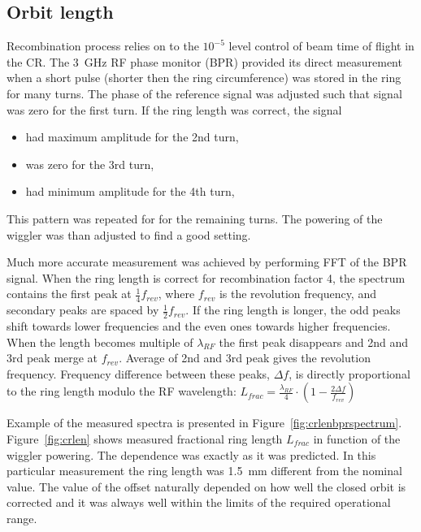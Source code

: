 \subsection{Orbit length \label{sec:ringlen}}

Recombination process relies on to the $10^{-5}$ level control of 
beam time of flight in the CR. 
The 3~GHz RF phase monitor (BPR) provided its direct measurement when a short pulse
(shorter then the ring circumference) was stored in the ring for many turns.
The phase of the reference signal was adjusted such that signal was zero for the first turn.
If the ring length was correct, the signal 
\begin{itemize}
 \item  had maximum amplitude for the 2nd turn,
 \item  was zero for the 3rd turn,
 \item  had minimum amplitude for the 4th turn,
\end{itemize}
This pattern was repeated for for the remaining turns.
The powering of the wiggler was than adjusted to find a good setting.

Much more accurate measurement was achieved by performing FFT of the BPR signal.
When the ring length is correct for recombination factor 4, 
the spectrum contains the first peak at $\frac{1}{4} f_{rev}$, 
where $f_{rev}$ is the revolution frequency, and
secondary peaks are spaced by $\frac{1}{2} f_{rev}$.
If the ring length is longer, the odd peaks shift towards 
lower frequencies and the even ones towards higher frequencies.
When the length becomes multiple of $\lambda_{RF}$ the first peak disappears
and 2nd and 3rd peak merge at $f_{rev}$.
Average of 2nd and 3rd peak gives the revolution frequency.
Frequency difference between these peaks, $\Delta f$, is directly proportional
to the ring length modulo the RF wavelength: 
$L_{frac} = \frac{\lambda_{RF}}{4} \cdot (1 - \frac{ 2 \Delta f}{f_{rev}})$

Example of the measured spectra is presented in Figure~\ref{fig:crlenbprspectrum}. 
Figure~\ref{fig:crlen} shows measured fractional ring length $L_{frac}$ 
in function of the wiggler powering. The dependence was exactly as it was predicted. 
In this particular measurement the ring length was 1.5~mm different from the nominal value. 
The value of the offset naturally depended on how well the closed orbit is corrected
and it was always well within the limits of the required operational range.

